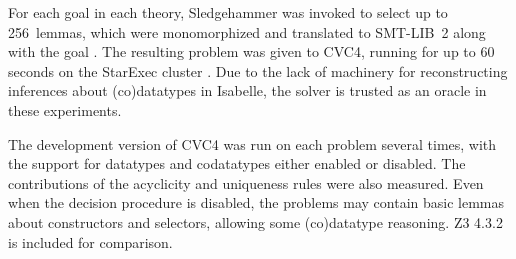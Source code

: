 
For each goal in each theory, Sledgehammer was invoked to select up to
256~lemmas, which were monomorphized and translated to SMT-LIB~2
along with the goal \cite{blanchette-et-al-2013-smt}. The resulting problem was
given to CVC4, running for up to 60 seconds on the StarExec cluster
\cite{stump-et-al-2014-starexec}.
Due to the lack of machinery for reconstructing inferences about (co)datatypes
in Isabelle, the solver is trusted as an oracle in these experiments.

The development version of CVC4 was run on each problem several times, with the
support for datatypes and codatatypes either enabled or disabled. The
contributions of the acyclicity and uniqueness rules were also measured.
Even when the
decision procedure is disabled, the problems may contain
basic lemmas about constructors and selectors, allowing some (co)datatype
reasoning. Z3 4.3.2 is included for comparison.



\newcommand\nummodden{num\hbox{\rm\_}mod\hbox{\rm\_}den}

